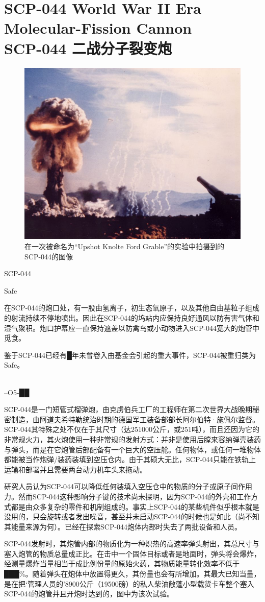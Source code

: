 \chapter[SCP-044 二战分子裂变炮]{
    SCP-044 World War II Era Molecular-Fission Cannon\\
    SCP-044 二战分子裂变炮
}

\label{chap:SCP-044}

\begin{figure}[H]
    \centering
    \includegraphics[width=0.5\linewidth]{images/SCP.044.jpg}
    \caption*{在一次被命名为“Upshot Knolte Ford Grable”的实验中拍摄到的SCP-044的图像}
\end{figure}

SCP-044

Safe

在SCP-044的炮口处，有一股由氢离子，初生态氧原子，以及其他自由基粒子组成的射流持续不停地喷出。因此在SCP-044的坞站内应保持良好通风以防有害气体和湿气聚积。炮口护幕应一直保持遮盖以防禽鸟或小动物进入SCP-044宽大的炮管中觅食。

鉴于SCP-044已经有█年未曾卷入由基金会引起的重大事件，SCP-044被重归类为Safe。

\\
–O5-██

SCP-044是一门短管式榴弹炮，由克虏伯兵工厂的工程师在第二次世界大战晚期秘密制造，由阿道夫希特勒统治时期的德国军工装备部部长阿尔伯特·施佩尔监督。SCP-044其特殊之处不仅在于其尺寸（达251000公斤，或251吨），而且还因为它的非常规火力，其火炮使用一种非常规的发射方式：并非是使用后膛来容纳弹壳装药与弹头，而是在它炮管后部配备有一个巨大的空压舱。任何物体，或任何一堆物体都能被当作炮弹\slash 装药装填到空压仓内。由于其硕大无比，SCP-044只能在铁轨上运输和部署并且需要两台动力机车头来拖动。

研究人员认为SCP-044可以降低任何装填入空压仓中的物质的分子或原子间作用力。然而SCP-044这种影响分子键的技术尚未探明，因为SCP-044的外壳和工作方式都是由众多复杂的零件和机制组成的。事实上SCP-044的某些机件似乎根本就是没用的，只会旋转或者发出噪音，甚至并未启动SCP-044的时候也是如此（尚不知其能量来源为何）。已经在探索SCP-044炮体内部时失去了两批设备和人员。

SCP-044发射时，其炮管内部的物质化为一种炽热的高速率弹头射出，其总尺寸与塞入炮管的物质总量成正比。在击中一个固体目标或者是地面时，弹头将会爆炸，经测量爆炸当量相当于成比例份量的原始火药，其物质能量转化效率不低于███\%。随着弹头在炮体中放置得更久，其份量也会有所增加。其最大已知当量，是在把‘管理人员的’8900公斤（19500磅）的私人柴油敞蓬小型载货卡车整个塞入SCP-044的炮管并且开炮时达到的，图中为该次试验。
